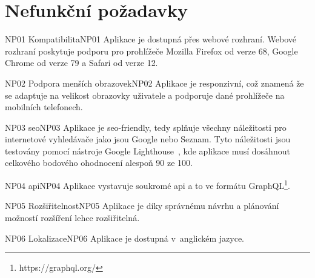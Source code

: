 \section{Nefunkční požadavky}
\label{sc:non_func_req}

\begin{requirment}{NP01 Kompatibilita}{NP01}
    Aplikace je dostupná přes webové rozhraní. Webové rozhraní poskytuje podporu pro prohlížeče Mozilla Firefox od verze 68, Google Chrome od verze 79 a Safari od verze 12.
\end{requirment}

\begin{requirment}{NP02 Podpora menších obrazovek}{NP02}
    Aplikace je responzivní, což znamená že se adaptuje na velikost obrazovky uživatele a podporuje dané prohlížeče na mobilních telefonech.
\end{requirment}

\begin{requirment}{NP03 \acrshort{seo}}{NP03}
    Aplikace je \acrshort{seo}-friendly, tedy splňuje všechny náležitosti pro internetové vyhledávače jako jsou Google nebo Seznam. Tyto náležitosti jsou testovány pomocí nástroje Google Lighthouse~\cite{googlellc_2019_lighthouse}, kde aplikace musí dosáhnout celkového bodového ohodnocení alespoň 90 ze 100.
\end{requirment}

\begin{requirment}{NP04 \acrshort{api}}{NP04}
    Aplikace vystavuje soukromé \acrshort{api} a to ve formátu GraphQL\footnote{https://graphql.org/}.
\end{requirment}

\begin{requirment}{NP05 Rozšiřitelnost}{NP05}
    Aplikace je díky správnému návrhu a plánování možností rozšíření lehce rozšiřitelná.
\end{requirment}

\begin{requirment}{NP06 Lokalizace}{NP06}
    Aplikace je dostupná v~anglickém jazyce.
\end{requirment}

